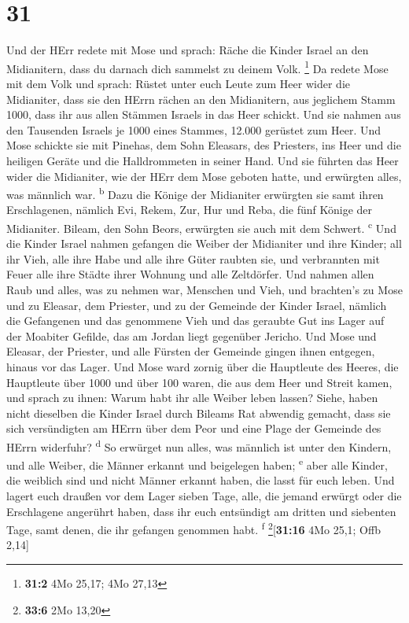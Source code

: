 \hypertarget{section-30}{%
\section{31}\label{section-30}}

 Und der HErr redete mit Mose und sprach: 
Räche die Kinder Israel an den Midianitern, dass du darnach dich
sammelst zu deinem Volk. \footnote{\textbf{31:2} 4Mo 25,17; 4Mo 27,13}
 Da redete Mose mit dem Volk und sprach: Rüstet unter euch
Leute zum Heer wider die Midianiter, dass sie den HErrn rächen an den
Midianitern,  aus jeglichem Stamm 1000, dass ihr aus allen
Stämmen Israels in das Heer schickt.  Und sie nahmen aus
den Tausenden Israels je 1000 eines Stammes, 12.000 gerüstet zum Heer.
 Und Mose schickte sie mit Pinehas, dem Sohn Eleasars, des
Priesters, ins Heer und die heiligen Geräte und die Halldrommeten in
seiner Hand.  Und sie führten das Heer wider die
Midianiter, wie der HErr dem Mose geboten hatte, und erwürgten alles,
was männlich war. \textsuperscript{b}  Dazu die Könige der
Midianiter erwürgten sie samt ihren Erschlagenen, nämlich Evi, Rekem,
Zur, Hur und Reba, die fünf Könige der Midianiter. Bileam, den Sohn
Beors, erwürgten sie auch mit dem Schwert. \textsuperscript{c}
 Und die Kinder Israel nahmen gefangen die Weiber der
Midianiter und ihre Kinder; all ihr Vieh, alle ihre Habe und alle ihre
Güter raubten sie,  und verbrannten mit Feuer alle ihre
Städte ihrer Wohnung und alle Zeltdörfer.  Und nahmen
allen Raub und alles, was zu nehmen war, Menschen und Vieh,
 und brachten's zu Mose und zu Eleasar, dem Priester, und
zu der Gemeinde der Kinder Israel, nämlich die Gefangenen und das
genommene Vieh und das geraubte Gut ins Lager auf der Moabiter Gefilde,
das am Jordan liegt gegenüber Jericho.  Und Mose und
Eleasar, der Priester, und alle Fürsten der Gemeinde gingen ihnen
entgegen, hinaus vor das Lager.  Und Mose ward zornig
über die Hauptleute des Heeres, die Hauptleute über 1000 und über 100
waren, die aus dem Heer und Streit kamen,  und sprach zu
ihnen: Warum habt ihr alle Weiber leben lassen?  Siehe,
haben nicht dieselben die Kinder Israel durch Bileams Rat abwendig
gemacht, dass sie sich versündigten am HErrn über dem Peor und eine
Plage der Gemeinde des HErrn widerfuhr? \textsuperscript{d}
 So erwürget nun alles, was männlich ist unter den
Kindern, und alle Weiber, die Männer erkannt und beigelegen haben;
\textsuperscript{e}  aber alle Kinder, die weiblich sind
und nicht Männer erkannt haben, die lasst für euch leben.
 Und lagert euch draußen vor dem Lager sieben Tage, alle,
die jemand erwürgt oder die Erschlagene angerührt haben, dass ihr euch
entsündigt am dritten und siebenten Tage, samt denen, die ihr gefangen
genommen habt. \textsuperscript{f} \footnote{\textbf{33:6} 2Mo 13,20}{[}\textbf{31:16}
4Mo 25,1; Offb 2,14{]}

